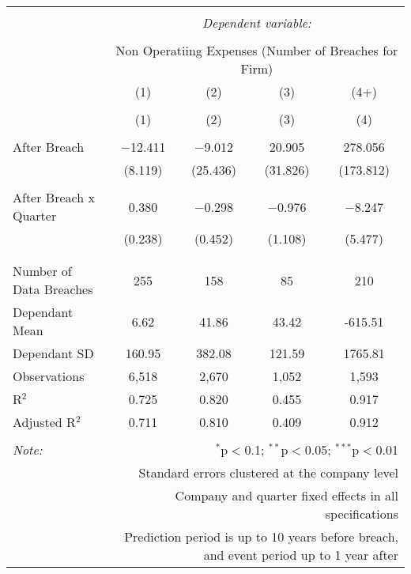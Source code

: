 
\begin{table}[!htbp] \centering 
  \caption{} 
  \label{} 
\begin{tabular}{@{\extracolsep{5pt}}lcccc} 
\\[-1.8ex]\hline 
\hline \\[-1.8ex] 
 & \multicolumn{4}{c}{\textit{Dependent variable:}} \\ 
\cline{2-5} 
\\[-1.8ex] & \multicolumn{4}{c}{Non Operatiing Expenses (Number of Breaches for Firm)} \\ 
 & (1) & (2) & (3) & (4+) \\ 
\\[-1.8ex] & (1) & (2) & (3) & (4)\\ 
\hline \\[-1.8ex] 
 After Breach & $-$12.411 & $-$9.012 & 20.905 & 278.056 \\ 
  & (8.119) & (25.436) & (31.826) & (173.812) \\ 
  & & & & \\ 
 After Breach x Quarter & 0.380 & $-$0.298 & $-$0.976 & $-$8.247 \\ 
  & (0.238) & (0.452) & (1.108) & (5.477) \\ 
  & & & & \\ 
\hline \\[-1.8ex] 
Number of Data Breaches  & 255 & 158 & 85 & 210 \\ 
Dependant Mean & 6.62 & 41.86 & 43.42 & -615.51 \\ 
Dependant SD & 160.95 & 382.08 & 121.59 & 1765.81 \\ 
Observations & 6,518 & 2,670 & 1,052 & 1,593 \\ 
R$^{2}$ & 0.725 & 0.820 & 0.455 & 0.917 \\ 
Adjusted R$^{2}$ & 0.711 & 0.810 & 0.409 & 0.912 \\ 
\hline 
\hline \\[-1.8ex] 
\textit{Note:}  & \multicolumn{4}{r}{$^{*}$p$<$0.1; $^{**}$p$<$0.05; $^{***}$p$<$0.01} \\ 
 & \multicolumn{4}{r}{Standard errors clustered at the company level} \\ 
 & \multicolumn{4}{r}{Company and quarter fixed effects in all specifications} \\ 
 & \multicolumn{4}{r}{Prediction period is up to 10 years before breach, and event period up to 1 year after} \\ 
\end{tabular} 
\end{table} 
